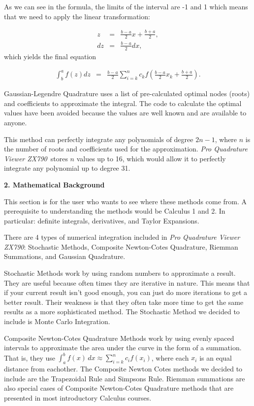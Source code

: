 \documentclass[12pt]{article}
\newcommand{\appname}{\textit{Pro Quadrature Viewer ZX790}}
\newcommand{\nextsection}[1]{\newpage\noindent\Large\textbf{#1}\vspace{10mm}\normalsize}
\newcommand{\integral}[3]{\text{$\int^{#2}_{#1} #3\,dx$}}
\newcommand{\summation}[3]{\text{$\sum^{#2}_{#1} #3$}}
\begin{document}
As we can see in the formula, the limits of the interval are -1 and 1 which means that we need to apply the linear transformation:

\begin{eqnarray*} z &=& \frac{b-a}{2}x + \frac{b+a}{2}, \\
dz &=& \frac{b-a}{2}dx,
\end{eqnarray*}
which yields the final equation

\begin{eqnarray*}
\int^a_b f(z)dz &=& \frac{b-a}{2}\summation{i = k}{n}{c_kf(\frac{b-a}{2}x_k + \frac{b+a}{2})}.
\end{eqnarray*}

Gaussian-Legendre Quadrature uses a list of pre-calculated optimal nodes (roots) and coefficients to approximate the integral. The code to calculate the optimal values have been avoided because the values are well known and are available to anyone. 

This method can perfectly integrate any polynomials of degree $2n-1$, where $n$ is the number of roots and coefficients used for the approximation. \appname\, stores $n$ values up to 16, which would allow it to perfectly integrate any polynomial up to degree 31.

\nextsection{2. Mathematical Background}

This section is for the user who wants to see where these methods come from. A prerequisite to understanding the methods would be Calculus 1 and 2. In particular: definite integrals, derivatives, and Taylor Expansions. 

There are 4 types of numerical integration included in \appname: Stochastic Methods, Composite Newton-Cotes Quadrature, Riemman Summations, and Gaussian Quadrature. 

Stochastic Methods work by using random numbers to approximate a result. They are useful because often times they are iterative in nature. This means that if your current result isn't good enough, you can just do more iterations to get a better result. Their weakness is that they often take more time to get the same results as a more sophisticated method. The Stochastic Method we decided to include is Monte Carlo Integration. 

Composite Newton-Cotes Quadrature Methods work by using evenly spaced intervals to approximate the area under the curve in the form of a summation. That is, they use $\integral{a}{b}{f(x)} \approx \summation{i=k}{n}{c_if(x_i)}$, where each $x_i$ is an equal distance from eachother. The Composite Newton Cotes methods we decided to include are the Trapezoidal Rule and Simpsons Rule. Riemman summations are also special cases of Composite Newton-Cotes Quadrature methods that are presented in most introductory Calculus courses. 
\end{document}
